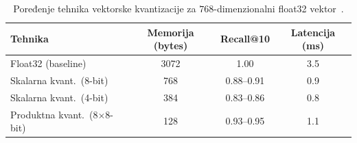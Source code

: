 \begin{table}[htbp]
\centering
\caption{Poređenje tehnika vektorske kvantizacije za $768$-dimenzionalni
\foreignlanguage{english}{float32} vektor~\cite{raja2026memory}.}
\label{tab:quant_comparison}
\begin{tabular}{lccc}
\hline
\textbf{Tehnika} & \textbf{Memorija (bytes)} &
\textbf{Recall@10} & \textbf{Latencija (ms)} \\
\hline
Float32 (baseline)              & 3072 & 1.00        & 3.5 \\
Skalarna kvant.\ (8-bit)        & 768  & 0.88--0.91  & 0.9 \\
Skalarna kvant.\ (4-bit)        & 384  & 0.83--0.86  & 0.8 \\
Produktna kvant.\ (8$\times$8-bit) & 128 & 0.93--0.95 & 1.1 \\
\hline
\end{tabular}
\end{table}
